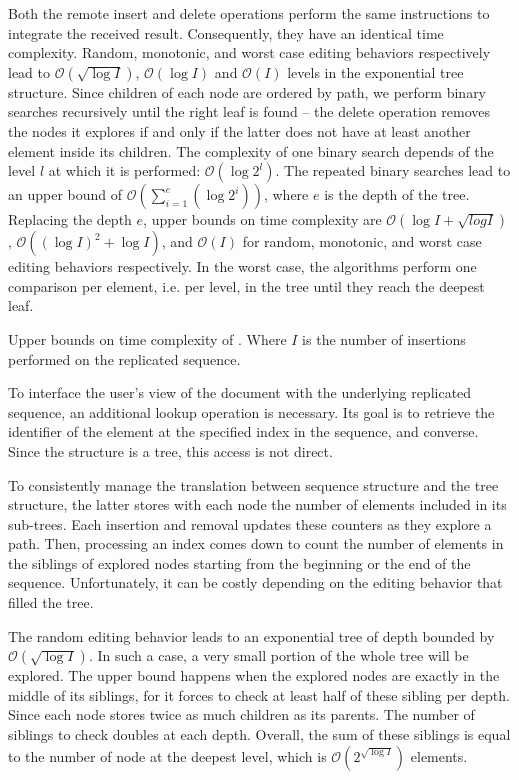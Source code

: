 Both the remote insert and delete operations perform the same instructions to
integrate the received result. Consequently, they have an identical time
complexity. Random, monotonic, and worst case editing behaviors respectively
lead to $\mathcal{O}(\sqrt{\log I})$, $\mathcal{O}(\log I)$ and $\mathcal{O}(I)$
levels in the exponential tree structure. Since children of each node are
ordered by path, we perform binary searches recursively until the right leaf is
found -- the delete operation removes the nodes it explores if and only if the
latter does not have at least another element inside its children. The
complexity of one binary search depends of the level $l$ at which it is
performed: $\mathcal{O}(\log 2^l)$. The repeated binary searches lead to an
upper bound of $\mathcal{O}(\textstyle\sum\nolimits_{i=1}^{e}(\log 2^i))$, where
$e$ is the depth of the tree. Replacing the depth $e$, upper bounds on time
complexity are $\mathcal{O}(\log I + \sqrt{log I})$,
$\mathcal{O}((\log I)^2+\log I)$, and $\mathcal{O}(I)$ for random, monotonic,
and worst case editing behaviors respectively. In the worst case, the algorithms
perform one comparison per element, i.e. per level, in the tree until they reach
the deepest leaf.


\begin{table}
  \caption{\label{table:lseqtime}
    Upper bounds on time complexity of \LSEQ. Where $I$ is the number of 
    insertions performed on the replicated sequence.}
  \centering
  
\end{table}

To interface the user's view of the document with the underlying replicated
sequence, an additional lookup operation is necessary. Its goal is to retrieve
the identifier of the element at the specified index in the sequence, and
converse. Since the structure is a tree, this access is not direct.

To consistently manage the translation between sequence structure and the tree
structure, the latter stores with each node the number of elements included in
its sub-trees. Each insertion and removal updates these counters as they explore
a path. Then, processing an index comes down to count the number of elements in
the siblings of explored nodes starting from the beginning or the end of the
sequence. Unfortunately, it can be costly depending on the editing behavior that
filled the tree.

The random editing behavior leads to an exponential tree of depth bounded by
$\mathcal{O}(\sqrt{\log I})$. In such a case, a very small portion of the whole
tree will be explored. The upper bound happens when the explored nodes are
exactly in the middle of its siblings, for it forces to check at least half of
these sibling per depth. Since each node stores twice as much children as its
parents. The number of siblings to check doubles at each depth. Overall, the sum
of these siblings is equal to the number of node at the deepest level, which is
$\mathcal{O}(2^{\sqrt{\log I}})$ elements. 

